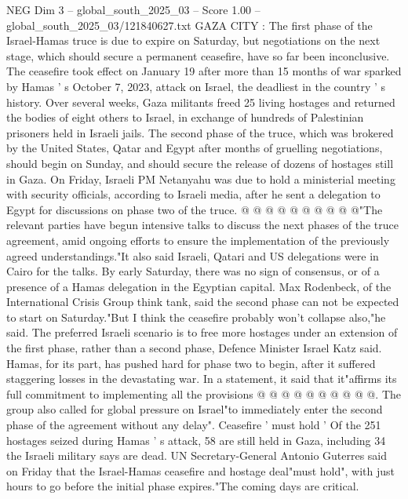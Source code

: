 \begin{textsample}{NEG Dim 3 – global\_south\_2025\_03 – Score 1.00 – global\_south\_2025\_03/121840627.txt}  \label{ex:f3_neg_421}
GAZA CITY : The first phase of the Israel-Hamas truce is due to expire on Saturday, but negotiations on the next stage, which should secure a permanent ceasefire, have so far been inconclusive.
The ceasefire took effect on January 19 after more than 15 months of war sparked by Hamas ' s October 7, 2023, attack on Israel, the deadliest in the country ' s history.
Over several weeks, Gaza militants freed 25 living hostages and returned the bodies of eight others to Israel, in exchange of hundreds of Palestinian prisoners held in Israeli jails.
The second phase of the truce, which was brokered by the United States, Qatar and Egypt after months of gruelling negotiations, should begin on Sunday, and should secure the release of dozens of hostages still in Gaza.
On Friday, Israeli PM Netanyahu was due to hold a ministerial meeting with security officials, according to Israeli media, after he sent a delegation to Egypt for discussions on phase two of the truce. @ @ @ @ @ @ @ @ @ @"The relevant parties have begun intensive talks to discuss the next phases of the truce agreement, amid ongoing efforts to ensure the implementation of the previously agreed understandings."It also said Israeli, Qatari and US delegations were in Cairo for the talks.
By early Saturday, there was no sign of consensus, or of a presence of a Hamas delegation in the Egyptian capital.
Max Rodenbeck, of the International Crisis Group think tank, said the second phase can not be expected to start on Saturday."But I think the ceasefire probably won't collapse also,"he said.
The preferred Israeli scenario is to free more hostages under an extension of the first phase, rather than a second phase, Defence Minister Israel Katz said.
Hamas, for its part, has pushed hard for phase two to begin, after it suffered staggering losses in the devastating war.
In a statement, it said that it"affirms its full commitment to implementing all the provisions @ @ @ @ @ @ @ @ @ @.
The group also called for global pressure on Israel"to immediately enter the second phase of the agreement without any delay".
Ceasefire ' must hold ' Of the 251 hostages seized during Hamas ' s attack, 58 are still held in Gaza, including 34 the Israeli military says are dead.
UN Secretary-General Antonio Guterres said on Friday that the Israel-Hamas ceasefire and hostage deal"must hold", with just hours to go before the initial phase expires."The coming days are critical.

\end{textsample}
